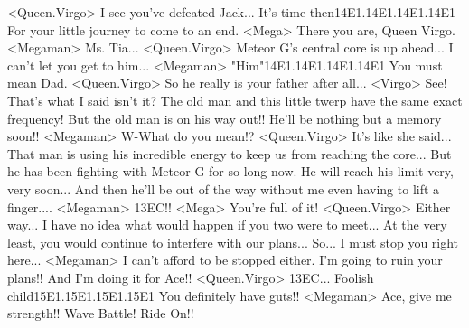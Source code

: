 <Queen.Virgo> I see you've defeated Jack... 
It's time then{14}{E1}.{14}{E1}.{14}{E1}.{14}{E1} For your little journey to come to an end. 
<Mega> There you are, Queen Virgo. 
<Megaman> Ms. Tia... 
<Queen.Virgo> Meteor G's central core is up ahead... 
I can't let you get to him... 
<Megaman> "Him"{14}{E1}.{14}{E1}.{14}{E1}.{14}{E1} You must mean Dad. 
<Queen.Virgo> So he really is your father after all... 
<Virgo> See! That's what I said isn't it? 
The old man and this little twerp have the same exact frequency! 
But the old man is on his way out!! 
He'll be nothing but a memory soon!! 
<Megaman> W-What do you mean!? 
<Queen.Virgo> It's like she said... 
That man is using his incredible energy to keep us from reaching the core... 
But he has been fighting with Meteor G for so long now. 
He will reach his limit very, very soon... 
And then he'll be out of the way without me even having to lift a finger.... 
<Megaman> {13}{EC}!! 
<Mega> You're full of it! 
<Queen.Virgo> Either way... 
I have no idea what would happen if you two were to meet... 
At the very least, you would continue to interfere with our plans... 
So... I must stop you right here... 
<Megaman> I can't afford to be stopped either. 
I'm going to ruin your plans!! And I'm doing it for Ace!! 
<Queen.Virgo> {13}{EC}... 
Foolish child{15}{E1}.{15}{E1}.{15}{E1}.{15}{E1} 
You definitely have guts!! 
<Megaman> Ace, give me strength!! 
Wave Battle! Ride On!! 

